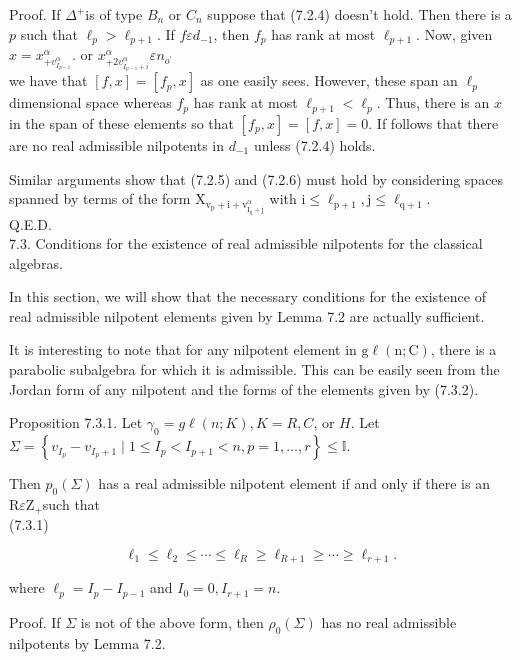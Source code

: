 \documentclass[10pt]{article}
\begin{document}
Proof. If $\Delta^{+}$is of type $B_{n}$ or $C_{n}$ suppose that (7.2.4) doesn't hold. Then there is a $p$ such that $\ell_{p}>\ell_{p+1}$. If $f \varepsilon d_{-1}$, then $f_{p}$ has rank at most $\ell_{p+1}$. Now, given $x=x_{+v_{I_{p-1}}^{\alpha}}^{\alpha}$. or $x_{+2 v_{I_{p-1}+i}^{\alpha}}^{\alpha} \varepsilon n_{o^{\prime}}$\\
we have that $[f, x]=\left[f_{p}, x\right]$ as one easily sees. However, these span an $\ell_{p}$ dimensional space whereas $f_{p}$ has rank at most $\ell_{p+1}<\ell_{p}$. Thus, there is an $x$ in the span of these elements so that $\left[f_{p}, x\right]=[f, x]=0$. If follows that there are no real admissible nilpotents in $d_{-1}$ unless (7.2.4) holds.

Similar arguments show that (7.2.5) and (7.2.6) must hold by considering spaces spanned by terms of the form $\mathrm{X}_{\mathrm{v}_{\mathrm{p}}+\mathrm{i}+\mathrm{v}_{\mathrm{I}_{\mathrm{q}}+\mathrm{j}}^{\alpha}}$ with $\mathrm{i} \leq \ell_{\mathrm{p}+1}, \mathrm{j} \leq \ell_{\mathrm{q}+1}$.\\
Q.E.D.\\
7.3. Conditions for the existence of real admissible nilpotents for the classical algebras.

In this section, we will show that the necessary conditions for the existence of real admissible nilpotent elements given by Lemma 7.2 are actually sufficient.

It is interesting to note that for any nilpotent element in $\mathrm{g} \ell(\mathrm{n} ; \mathrm{C})$, there is a parabolic subalgebra for which it is admissible. This can be easily seen from the Jordan form of any nilpotent and the forms of the elements given by (7.3.2).

Proposition 7.3.1. Let $\gamma_{0}=g \ell(n ; K), K=R, C$, or $H$. Let $\Sigma=\left\{v_{I_{p}}-v_{I_{p}+1} \mid 1 \leq I_{p}<I_{p+1}<n, p=1, \ldots, r\right\} \leq \mathbb{I}$.

Then $p_{0}(\Sigma)$ has a real admissible nilpotent element if and only if there is an $\mathrm{R} \varepsilon \mathrm{Z}_{+}$such that\\
(7.3.1)

$$
\ell_{1} \leq \ell_{2} \leq \cdots \leq \ell_{R} \geq \ell_{R+1} \geq \cdots \geq \ell_{r+1} .
$$

where $\ell_{p}=I_{p}-I_{p-1}$ and $I_{0}=0, I_{r+1}=n$.

Proof. If $\Sigma$ is not of the above form, then $\rho_{0}(\Sigma)$ has no real admissible nilpotents by Lemma 7.2.
\end{document}
